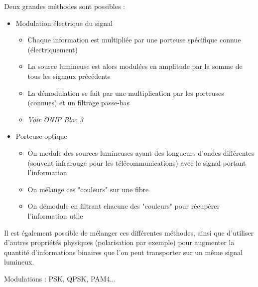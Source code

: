 \documentclass[a4paper,french]{paper}
\begin{document}
Deux grandes méthodes sont possibles :

\begin{itemize}
	\item Modulation électrique du signal
	\begin{itemize}
		\item Chaque information est multipliée par une porteuse spécifique connue (électriquement)
		\item La source lumineuse est alors modulées en amplitude par la somme de tous les signaux précédents
		\item La démodulation se fait par une multiplication par les porteuses (connues) et un filtrage passe-bas
		\item \textit{Voir ONIP Bloc 3}
	\end{itemize}

	\qquad
	
	\item Porteuse optique
	\begin{itemize}
		\item On module des sources lumineuses ayant des longueurs d'ondes différentes (souvent infrarouge pour les télécommunications) avec le signal portant l'information
		\item On mélange ces "couleurs" sur une fibre
		\item On démodule en filtrant chacune des "couleurs" pour récupérer l'information utile
	\end{itemize}	
\end{itemize}

Il est également possible de mélanger ces différentes méthodes, ainsi que d'utiliser d'autres propriétés physiques (polarisation par exemple) pour augmenter la quantité d'informations binaires que l'on peut transporter sur un même signal lumineux.

Modulations : PSK, QPSK, PAM4...




\end{document}
